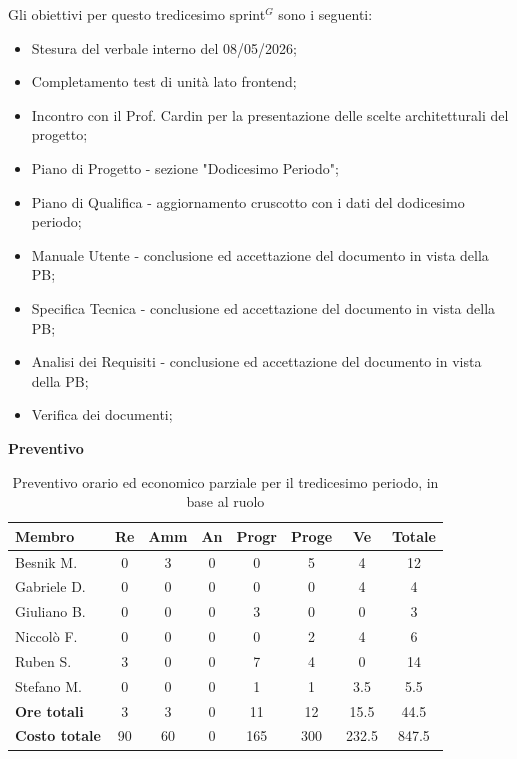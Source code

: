 \documentclass[a4paper,10pt]{article}
\begin{document}
Gli obiettivi per questo tredicesimo sprint$^G$ sono i seguenti:
\begin{itemize}
  \item Stesura del verbale interno del 08/05/2026;
  \item Completamento test di unità lato frontend;
  \item Incontro con il Prof. Cardin per la presentazione delle scelte architetturali del progetto;
  \item Piano di Progetto - sezione "Dodicesimo Periodo";
  \item Piano di Qualifica - aggiornamento cruscotto con i dati del dodicesimo periodo;
  \item Manuale Utente - conclusione ed accettazione del documento in vista della PB;
  \item Specifica Tecnica - conclusione ed accettazione del documento in vista della PB;
  \item Analisi dei Requisiti - conclusione ed accettazione del documento in vista della PB;
  \item Verifica dei documenti;
\end{itemize}

\textbf{Preventivo} \\
\begin{table}[H]
  \centering
  \begin{tabular}{|l|c|c|c|c|c|c|c|}
    \hline
    \textbf{Membro} & \textbf{Re} & \textbf{Amm} & \textbf{An} & \textbf{Progr} & \textbf{Proge} & \textbf{Ve} & \textbf{Totale} \\
    \hline
    Besnik M.   & 0 & 3 & 0 & 0   & 5 & 4   & 12  \\
    Gabriele D. & 0 & 0 & 0 & 0   & 0 & 4   & 4  \\
    Giuliano B. & 0 & 0 & 0 & 3   & 0 & 0   & 3  \\
    Niccolò F.  & 0 & 0 & 0 & 0   & 2 & 4   & 6  \\
    Ruben S.    & 3 & 0 & 0 & 7   & 4 & 0   & 14 \\
    Stefano M.  & 0 & 0 & 0 & 1   & 1 & 3.5   & 5.5  \\
    \hline
    \textbf{Ore totali} & 3  & 3 & 0 & 11  & 12 & 15.5 & 44.5 \\
    \hline
    \textbf{Costo totale} & 90 & 60 & 0 & 165  & 300  & 232.5 & 847.5 \\
    \hline
  \end{tabular}
  \caption{Preventivo orario ed economico parziale per il tredicesimo periodo, in base al ruolo}
\end{table}
\end{document}
